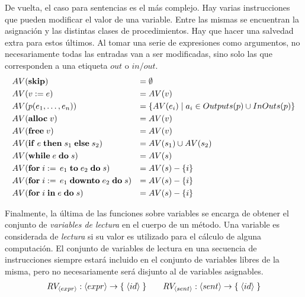 \documentclass{article}
\begin{document}


De vuelta, el caso para sentencias es el más complejo.
Hay varias instrucciones que pueden modificar el valor de una variable.
Entre las mismas se encuentran la asignación y las distintas clases de procedimientos.
Hay que hacer una salvedad extra para estos últimos.
Al tomar una serie de expresiones como argumentos, no necesariamente todas las entradas van a ser modificadas, sino solo las que corresponden a una etiqueta $out$ o $in/out$.
\begin{align*}
&AV(\mathbf{skip})
&=&\;
\emptyset
\\
&AV(v := e)
&=&\;
AV(v)
\\
&AV(p(e_1, \ldots, e_n))
&=&\;
\{ AV(e_i) \mid a_i \in Outputs(p) \cup InOuts(p) \}
\\
&AV(\mathbf{alloc} \; v)
&=&\;
AV(v)
\\
&AV(\mathbf{free} \; v)
&=&\;
AV(v)
\\
&AV(\mathbf{if} \; e \; \mathbf{then} \; s_1 \; \mathbf{else} \; s_2)
&=&\;
AV(s_1) \cup AV(s_2)
\\
&AV(\mathbf{while} \; e \; \mathbf{do} \; s)
&=&\;
AV(s)
\\
&AV(\mathbf{for} \; i := \, e_1 \; \mathbf{to} \; e_2 \; \mathbf{do} \; s)
&=&\;
AV(s) - \{ i \}
\\
&AV(\mathbf{for} \; i := \, e_1 \; \mathbf{downto} \; e_2 \; \mathbf{do} \; s)
&=&\;
AV(s) - \{ i \}
\\
&AV(\mathbf{for} \; i \; \mathbf{in} \; e \; \mathbf{do} \; s)
&=&\;
AV(s) - \{ i \}
\end{align*}

Finalmente, la última de las funciones sobre variables se encarga de obtener el conjunto de \textit{variables de lectura} en el cuerpo de un método.
Una variable es considerada de \textit{lectura} si su valor es utilizado para el cálculo de alguna computación.
El conjunto de variables de lectura en una secuencia de instrucciones siempre estará incluido en el conjunto de variables libres de la misma, pero no necesariamente será disjunto al de variables asignables.
\begin{gather*}
RV_{\langle expr \rangle}: \langle expr \rangle \rightarrow \{ \; \langle id \rangle \; \}
\qquad
RV_{\langle sent \rangle}: \langle sent \rangle \rightarrow \{ \; \langle id \rangle \; \}
\end{gather*}
\end{document}

